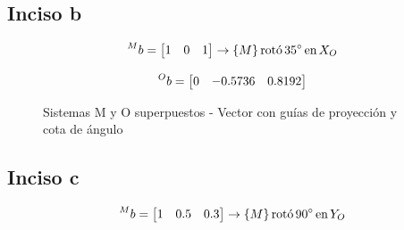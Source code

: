 \documentclass[a4paper,12pt]{article}
\begin{document}
\subsection{Inciso b}
\begin{equation*}
    \prescript{M}{}{b} = 
    \begin{bmatrix}
        1 & 0 & 1
    \end{bmatrix}
    \rightarrow \{M\} \, \text{rotó} \,  35^\circ \, \text{en}\, X_O
\end{equation*}

\begin{equation*}
    \prescript{O}{}{b} = 
    \begin{bmatrix}
        0 & -0.5736 & 0.8192
    \end{bmatrix}
\end{equation*}

\begin{figure}[H]
    \centering
    \begin{adjustbox}{scale = 0.85, max width=\columnwidth}
    \end{adjustbox}
    \caption{Sistemas M y O superpuestos - Vector con guías de proyección y cota de ángulo}
\end{figure}

\subsection{Inciso c}
\begin{equation*}
    \prescript{M}{}{b} = 
    \begin{bmatrix}
        1 & 0.5 & 0.3
    \end{bmatrix}
    \rightarrow \{M\} \, \text{rotó} \,  90^\circ \, \text{en}\, Y_O
\end{equation*}
\end{document}
